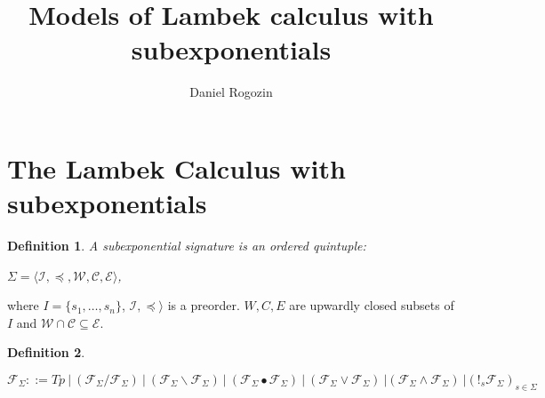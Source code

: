 \documentclass[a4paper]{article}
\date{}
\author[1,2]{Daniel Rogozin}
\affil[1]{Lomonosov Moscow State University}
\affil[2]{Serokell O\"{U}}
\title{Models of Lambek calculus with subexponentials}
\theoremstyle{defin}
\newtheorem{defin}{Definition}
\theoremstyle{theorem}
\theoremstyle{prop}
\theoremstyle{lemma}
\theoremstyle{ex}
\theoremstyle{col}
\begin{document}
\maketitle

\begin{abstract}
\end{abstract}

\section{The Lambek Calculus with subexponentials}

\begin{defin} A subexponential signature is an ordered quintuple:

  $\Sigma = \langle \mathcal{I}, \preceq, \mathcal{W}, \mathcal{C}, \mathcal{E} \rangle$,
\end{defin}

where $I = \{ s_1, \dots, s_n\}$, $\mathcal{I}, \preceq \rangle$ is a preorder.
$W, C, E$ are upwardly closed subsets of $I$ and $\mathcal{W} \cap \mathcal{C} \subseteq \mathcal{E}$.


\begin{defin}
$ $

  $\mathcal{F}_{\Sigma} ::= Tp \: | \: (\mathcal{F}_{\Sigma} / \mathcal{F}_{\Sigma}) \: | \: (\mathcal{F}_{\Sigma} \backslash
  \mathcal{F}_{\Sigma}) \: | \: (\mathcal{F}_{\Sigma} \bullet \mathcal{F}_{\Sigma}) \: | \: (\mathcal{F}_{\Sigma} \lor \mathcal{F}_{\Sigma}) \: | (\mathcal{F}_{\Sigma} \land \mathcal{F}_{\Sigma}) \: | ({!_s \mathcal{F}_{\Sigma}})_{s \in
  \Sigma} $
\end{defin}
\end{document}
